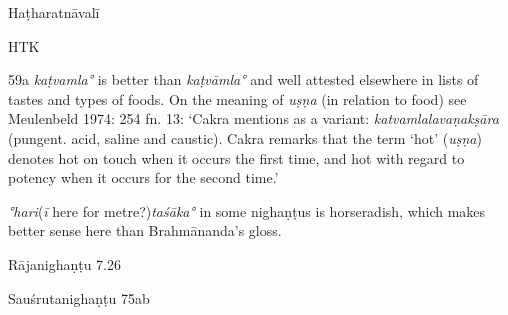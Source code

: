 \begin{ekdosis}
\begin{testimonia}[hp01_059]
Haṭharatnāvalī

\begin{versinnote}
\end{versinnote}

HTK

\begin{versinnote}
\end{versinnote}

\end{testimonia}

\begin{philcomm}[hp01_059]
59a \emph{kaṭvamla°} is better than \emph{kaṭvāmla°} and well attested elsewhere in lists of tastes and types of foods.
On the meaning of \emph{uṣṇa} (in relation to food) see Meulenbeld 1974: 254 fn. 13: ‘Cakra mentions as a variant: \emph{katvamlalavaṇakṣāra} (pungent. acid, saline and caustic). Cakra remarks that the term `hot' (\emph{uṣṇa}) denotes hot on touch when it occurs the first time, and hot with regard to potency when it occurs for the second time.’

\emph{°hari}(\emph{ī} here for metre?)\emph{taśāka°} in some nighaṇṭus is horseradish, which makes better sense here than Brahmānanda’s gloss.

Rājanighaṇṭu 7.26

\begin{versinnote}
\end{versinnote}

Sauśrutanighaṇṭu 75ab
\begin{versinnote}
\end{versinnote}


\end{philcomm}
\end{ekdosis}
